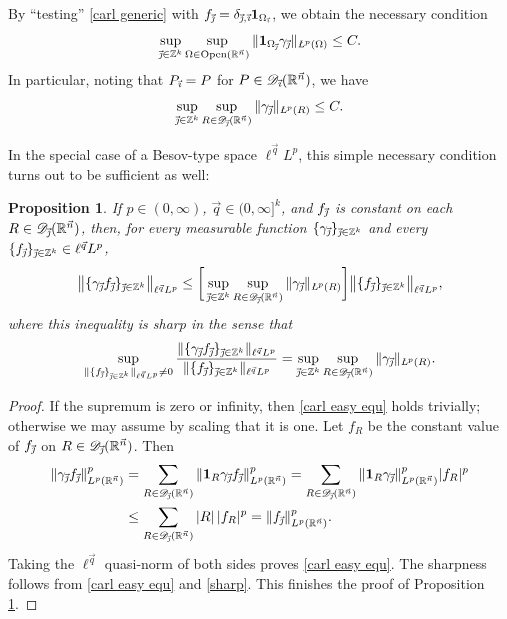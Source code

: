 \documentclass[11pt, reqno]{amsart}
\newtheorem{proposition}[theorem]{Proposition}
\theoremstyle{definition}
\theoremstyle{remark}
\numberwithin{equation}{section}
\newcommand{\D}{\mathscr D}
\newcommand{\R}{\mathbb R}
\newcommand{\Z}{\mathbb Z}
\newcommand{\vi}{\vec{\textit{\i}}}
\newcommand{\vj}{\vec{\textit{\j}}}
\newcommand{\vn}{\vec n}
\newcommand{\vq}{\vec q}
\newcommand{\one}{\mathbf{1}}
\newcommand{\aveL}{\textit{\L}}
\newcommand{\abs}[1]{|#1|}
\newcommand{\Norm}[2]{\|#1\|_{#2}}
\newcommand{\bNorm}[2]{\big\|#1\big\|_{#2}}
\newcommand{\Open}{\mathrm{Open}}
\begin{document}
By ``testing'' \eqref{carl generic}
with $f_{\vj}=\delta_{\vj,\vi}\one_{\Omega_{\vi}}$,
we obtain the necessary condition
\begin{equation*}
\sup_{\vj\in\Z^k}\sup_{\Omega\in\Open(\R^{\vn})}
\Norm{\one_{\Omega_{\vj}}\gamma_{\vj}}{\aveL^p(\Omega)}\leq C.
\end{equation*}
In particular, noting that $P_{\vi}=P$ for $P\in\D_{\vi}(\R^{\vn})$, we have
\begin{equation}\label{sharp}
\sup_{\vj\in\Z^k}\sup_{R\in\D_{\vj}(\R^{\vn})}
\Norm{\gamma_{\vj}}{\aveL^p(R)}\leq C.
\end{equation}

In the special case of a Besov-type space $\ell^{\vq}L^p$, this simple necessary condition turns out to be sufficient as well:

\begin{proposition}\label{carl easy}
If $p\in(0,\infty)$, $\vq\in(0,\infty]^k$,
and $f_{\vj}$ is constant on each $R\in\D_{\vj}(\R^{\vn})$,
then, for every measurable function $\{\gamma_{\vj}\}_{\vj\in\mathbb Z^k}$ and
every $\{ f_{\vj}\}_{\vj\in\mathbb Z^k}\in\ell^{\vq}L^p$,
\begin{equation}\label{carl easy equ}
\bNorm{\{\gamma_{\vj}f_{\vj}\}_{\vj\in\mathbb Z^k}}{\ell^{\vq}L^p}
\leq\bigg[\sup_{\vj\in\mathbb Z^k}\sup_{R\in\D_{\vj}(\R^{\vn})}
\Norm{\gamma_{\vj}}{\aveL^p(R)}\bigg]
\bNorm{\{ f_{\vj}\}_{\vj\in\mathbb Z^k}}{\ell^{\vq}L^p},
\end{equation}
where this inequality is \emph{sharp} in the sense that
$$
\sup_{\|\{ f_{\vj}\}_{\vj\in\mathbb Z^k}\|_{\ell^{\vq}L^p}\neq 0}
\frac{\|\{\gamma_{\vj}f_{\vj}\}_{\vj\in\mathbb Z^k}\|_{\ell^{\vq}L^p}}
{\|\{ f_{\vj}\}_{\vj\in\mathbb Z^k}\|_{\ell^{\vq}L^p}}
=\sup_{\vj\in\mathbb Z^k}\sup_{R\in\D_{\vj}(\R^{\vn})}
\Norm{\gamma_{\vj}}{\aveL^p(R)}.
$$
\end{proposition}

\begin{proof}
If the supremum is zero or infinity,
then \eqref{carl easy equ} holds trivially;
otherwise we may assume by scaling that it is one.
Let $f_R$ be the constant value of $f_{\vj}$ on $R\in\D_{\vj}(\R^{\vn})$. Then
\begin{equation*}
\begin{split}
\Norm{\gamma_{\vj}f_{\vj}}{L^p(\R^{\vn})}^p
&=\sum_{R\in\D_{\vj}(\R^{\vn})}\Norm{\one_R\gamma_{\vj}f_{\vj}}{L^p(\R^{\vn})}^p
=\sum_{R\in\D_{\vj}(\R^{\vn})}\Norm{\one_R\gamma_{\vj}}{L^p(\R^{\vn})}^p\abs{f_R}^p \\
&\leq\sum_{R\in\D_{\vj}(\R^{\vn})}\abs{R}\,\abs{f_R}^p
=\Norm{f_{\vj}}{L^p(\R^{\vn})}^p.
\end{split}
\end{equation*}
Taking the $\ell^{\vq}$ quasi-norm of both sides proves \eqref{carl easy equ}.
The sharpness follows from \eqref{carl easy equ} and \eqref{sharp}.
This finishes the proof of Proposition \ref{carl easy}.
\end{proof}
\end{document}
